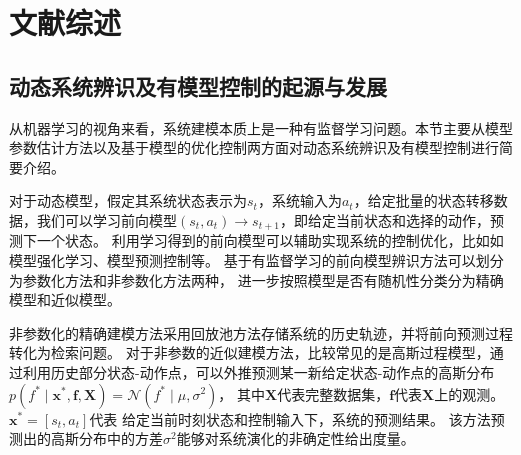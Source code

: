 \chapter{文献综述}
    



\section{动态系统辨识及有模型控制的起源与发展}
\label{sec:2_1}

从机器学习的视角来看，系统建模本质上是一种有监督学习问题\cite{jordan1992forward}。本节主要从模型参数估计方法以及基于模型的优化控制两方面对动态系统辨识及有模型控制进行简要介绍。

对于动态模型，假定其系统状态表示为$s_t$，系统输入为$a_t$，给定批量的状态转移数据，我们可以学习前向模型$\left(s_t, a_t\right) \rightarrow s_{t+1}$，即给定当前状态和选择的动作，预测下一个状态。
利用学习得到的前向模型可以辅助实现系统的控制优化，比如如模型强化学习、模型预测控制等\cite{moerland2020model}。
基于有监督学习的前向模型辨识方法可以划分为参数化方法和非参数化方法两种，
进一步按照模型是否有随机性分类分为精确模型和近似模型。

非参数化的精确建模方法采用回放池\cite{lin1992memory}方法存储系统的历史轨迹，并将前向预测过程转化为检索问题。
对于非参数的近似建模方法，比较常见的是高斯过程模型\cite{deisenroth2011pilco,deisenroth2011pilco}，通过利用历史部分状态-动作点，可以外推预测某一新给定状态-动作点的高斯分布$p\left(f^* \mid \boldsymbol{x}^*, \boldsymbol{f}, \boldsymbol{X}\right)=\mathcal{N}\left(f^* \mid \mu, \sigma^2\right)$，
其中$\boldsymbol{X}$代表完整数据集，$\boldsymbol{f}$代表$\boldsymbol{X}$上的观测。$\boldsymbol{x}^*=[s_t,a_t]$代表
给定当前时刻状态和控制输入下，系统的预测结果。
该方法预测出的高斯分布中的方差$\sigma^2$能够对系统演化的非确定性给出度量。

